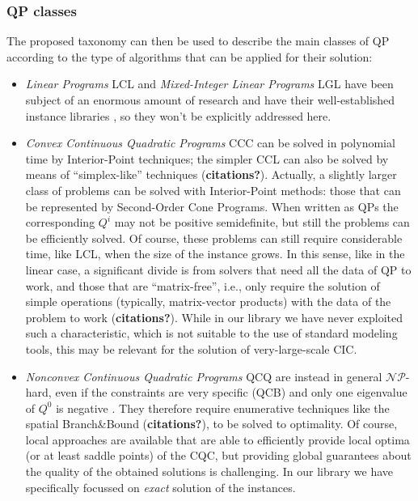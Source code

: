 \subsubsection{QP classes}\label{ssec:classes}

The proposed taxonomy can then be used to describe the main classes of QP according to the type of algorithms that can be applied for their solution:
%
\begin{itemize}
 \item \emph{Linear Programs} LCL and \emph{Mixed-Integer Linear Programs} LGL have been subject of an enormous amount of research and have their well-established instance libraries \cite{Koch2011}, so they won't be explicitly addressed here.
 \item \emph{Convex Continuous Quadratic Programs} CCC can be solved in polynomial time by Interior-Point techniques; the simpler CCL can also be solved by means of ``simplex-like'' techniques ({\bf citations?}). Actually, a slightly larger class of problems can be solved with Interior-Point methods: those that can be represented by Second-Order Cone Programs. When written as QPs the corresponding $Q^i$ may not be positive semidefinite, but still the problems can be efficiently solved. Of course, these problems can still require considerable time, like LCL, when the size of the instance grows. In this sense, like in the linear case, a significant divide is from solvers that need all the data of QP to work, and those that are ``matrix-free'', i.e., only require the solution of simple operations (typically, matrix-vector products) with the data of the problem to work ({\bf citations?}). While in our library we have never exploited such a characteristic, which is not suitable to the use of standard modeling tools, this may be relevant for the solution of very-large-scale CIC.
 \item \emph{Nonconvex Continuous Quadratic Programs} QCQ are instead in general $\mathcal{NP}$-hard, even if the constraints are very specific (QCB) and only one eigenvalue of $Q^0$ is negative \cite{Hemmecke2010}. They therefore require enumerative techniques like the spatial Branch\&Bound ({\bf citations?}), to be solved to optimality. Of course, local approaches 
are available that are able to
efficiently provide local optima (or at least saddle points) of the CQC, but providing global guarantees about the quality of the obtained solutions is challenging. In our library we have specifically focussed on  \emph{exact} solution of the instances.

\end{itemize}
